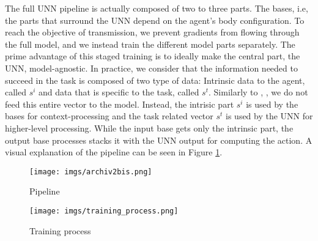 \documentclass[letterpaper, 10 pt, conference]{ieeeconf}  %
\begin{document}

The full UNN pipeline is actually composed of two to three parts. The bases, i.e, the parts that surround the UNN depend on the agent's body configuration. To reach the objective of transmission, we prevent gradients from flowing through the full model, and we instead train the different model parts separately. The prime advantage of this staged training is to ideally make the central part, the UNN, model-agnostic. In practice, we consider that the information needed to succeed in the task is composed of two type of data: Intrinsic data to the agent, called $s^i$ and data that is specific to the task, called $s^t$. Similarly to \cite{UNN}, \cite{TREX_RL}, we do not feed this entire vector to the model. Instead, the intrisic part $s^i$ is used by the bases for context-processing and the task related vector $s^t$ is used by the UNN for higher-level processing. While the input base gets only the intrinsic part, the output base processes stacks it with the UNN output for computing the action. A visual explanation of the pipeline can be seen in Figure \ref{pipeline}. 


\begin{figure}
\centering
\texttt{[image: imgs/archiv2bis.png]}
\caption{Pipeline}
\label{pipeline}
\end{figure}


\begin{figure}
\centering
\texttt{[image: imgs/training\_process.png]}
\caption{Training process}
\label{training_process}
\end{figure}
\end{document}
